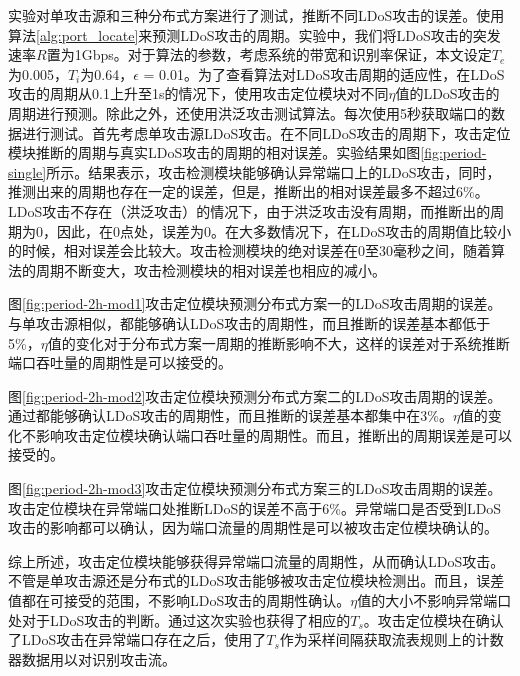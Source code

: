 实验对单攻击源和三种分布式方案进行了测试，推断不同LDoS攻击的误差。使用算法\ref{alg:port_locate}来预测LDoS攻击的周期。实验中，我们将LDoS攻击的突发速率$R$置为1Gbps。对于算法的参数，考虑系统的带宽和识别率保证，本文设定$T_e$为0.005，$T_i$为0.64，$\epsilon$ = 0.01。为了查看算法对LDoS攻击周期的适应性，在LDoS攻击的周期从0.1上升至1s的情况下，使用攻击定位模块对不同$\eta$值的LDoS攻击的周期进行预测。除此之外，还使用洪泛攻击测试算法。每次使用5秒获取端口的数据进行测试。首先考虑单攻击源LDoS攻击。在不同LDoS攻击的周期下，攻击定位模块推断的周期与真实LDoS攻击的周期的相对误差。实验结果如图\ref{fig:period-single}所示。结果表示，攻击检测模块能够确认异常端口上的LDoS攻击，同时，推测出来的周期也存在一定的误差，但是，推断出的相对误差最多不超过6\%。LDoS攻击不存在（洪泛攻击）的情况下，由于洪泛攻击没有周期，而推断出的周期为0，因此，在0点处，误差为0。在大多数情况下，在LDoS攻击的周期值比较小的时候，相对误差会比较大。攻击检测模块的绝对误差在0至30毫秒之间，随着算法的周期不断变大，攻击检测模块的相对误差也相应的减小。

图\ref{fig:period-2h-mod1}攻击定位模块预测分布式方案一的LDoS攻击周期的误差。与单攻击源相似，都能够确认LDoS攻击的周期性，而且推断的误差基本都低于5\%，$\eta$值的变化对于分布式方案一周期的推断影响不大，这样的误差对于系统推断端口吞吐量的周期性是可以接受的。

图\ref{fig:period-2h-mod2}攻击定位模块预测分布式方案二的LDoS攻击周期的误差。通过都能够确认LDoS攻击的周期性，而且推断的误差基本都集中在3\%。$\eta$值的变化不影响攻击定位模块确认端口吞吐量的周期性。而且，推断出的周期误差是可以接受的。

图\ref{fig:period-2h-mod3}攻击定位模块预测分布式方案三的LDoS攻击周期的误差。攻击定位模块在异常端口处推断LDoS的误差不高于6\%。异常端口是否受到LDoS攻击的影响都可以确认，因为端口流量的周期性是可以被攻击定位模块确认的。

综上所述，攻击定位模块能够获得异常端口流量的周期性，从而确认LDoS攻击。不管是单攻击源还是分布式的LDoS攻击能够被攻击定位模块检测出。而且，误差值都在可接受的范围，不影响LDoS攻击的周期性确认。$\eta$值的大小不影响异常端口处对于LDoS攻击的判断。通过这次实验也获得了相应的$T_s$。攻击定位模块在确认了LDoS攻击在异常端口存在之后，使用了$T_s$作为采样间隔获取流表规则上的计数器数据用以对识别攻击流。

